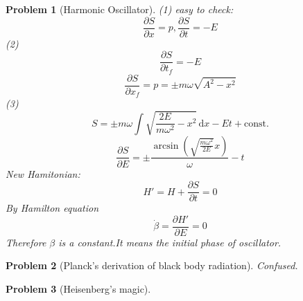 \documentclass{article}
\theoremstyle{t}
\newtheorem{problem}{Problem}
\newcommand{\dd}{\mathrm{d}}
\newcommand{\pa}{\partial}
\begin{document}
\begin{problem}[Harmonic Oscillator]
    (1) easy to check:
    \begin{equation}
        \frac{\pa S}{\pa x}=p,\frac{\pa S}{\pa t}=-E
    \end{equation}
    (2)\begin{equation}
        \frac{\pa S}{\pa t_f}=-E
    \end{equation}
    \begin{equation}
        \frac{\pa S}{\pa x_f}=p=\pm m \omega \sqrt{A^2-x^2}
    \end{equation}
    (3)
    \begin{equation}
        S=\pm m \omega \int \sqrt{\frac{2E}{m \omega^2}-x^2}\, \dd x-E t+\mathrm{const.}
    \end{equation}
    \begin{equation}
        \frac{\pa S}{\pa E}=\pm \frac{\arcsin (\sqrt{\frac{m \omega^2}{2E}}x)}{\omega}-t
    \end{equation}
    New Hamitonian:
    \begin{equation}
        H'=H+\frac{\pa S}{\pa t}=0
    \end{equation}
    By Hamilton equation
    \begin{equation}
        \dot{\beta}=\frac{\pa H'}{\pa E}=0
    \end{equation}
    Therefore $\beta$ is a constant.It means the initial phase of  oscillator.
\end{problem}
\begin{problem}[Planck’s derivation of black body radiation]
    Confused.
\end{problem}
\begin{problem}[Heisenberg’s magic]

\end{problem}
\end{document}
